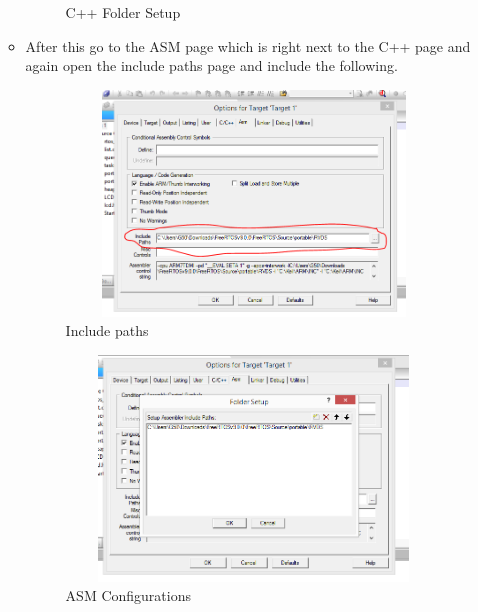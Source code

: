 \documentclass{article}
\begin{document}
\begin{enumerate}
\begin{itemize}
\begin{figure}[H]
\caption{C++ Folder Setup}
\end{figure}
\item After this go to the ASM page which is right next to the C++ page and again open the include paths page and include the following.
\begin{figure}[H]
\centering
\includegraphics[width=10cm,height=6cm]{asm.PNG}
\caption{Include paths}
\end{figure}
\begin{figure}[H]
\centering
\includegraphics[width=10cm,height=6cm]{asmpath.PNG}
\caption{ASM Configurations}
\end{figure}


\end{itemize}
\end{enumerate}
\end{document}
